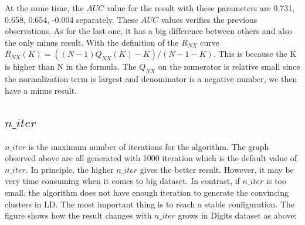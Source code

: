 \noindent At the same time, the $AUC$ value for the result with these parameters are 0.731, 0.658, 0.654, -0.004 separately. These $AUC$ values verifies the previous observations. As for the last one, it has a big difference between others and also the only minus result. With the definition of the $R_{NX}$ curve $R_{NX} (K) = ((N − 1)Q_{NX} (K) − K) /(N − 1 − K)$. This is because the K is higher than N in the formula. The $Q_{NX}$ on the numerator is relative small since the normalization term is largest and denominator is a negative number, we then have a minus result.

\subsection{$n\_iter$}

\noindent $n\_iter$ is the maximum number of iterations for the algorithm. The graph observed above are all generated with 1000 iteration which is the default value of $n\_iter$. In principle, the higher $n\_iter$ gives the better result. However, it may be very time consuming when it comes to big dataset. In contrast, if $n\_iter$ is too small, the algorithm does not have enough iteration to generate the convincing clusters in LD. The most important thing is to reach a stable configuration. The figure shows how the result changes with $n\_iter$ grows in Digits dataset as above:

